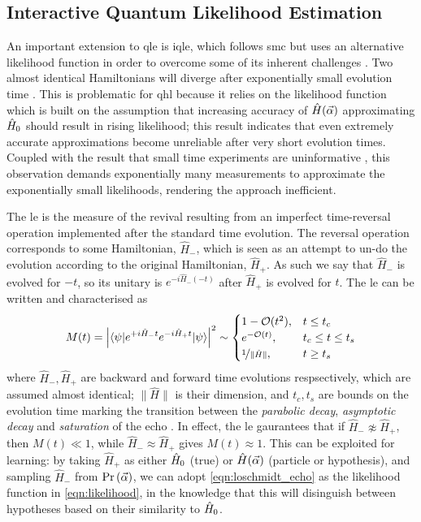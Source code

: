 \subsection{Interactive Quantum Likelihood Estimation}\label{sec:iqle}
An important extension to \gls{qle} is \gls{iqle}, 
    which follows \gls{smc} but uses an alternative \gls{likelihood} function in order to 
    overcome some of its inherent challenges \cite{Wiebe:2014qhl}. 
Two almost identical Hamiltonians will diverge after exponentially small evolution time \cite{jalabert2001environment}.
This is problematic for \gls{qhl} because it relies on the likelihood function which is built on the assumption 
    that increasing accuracy of $\hat{H}(\vec{\alpha})$ approximating $\hat{H}_0$ should result in rising likelihood;
    this result indicates that even extremely accurate approximations become unreliable after very short evolution times. 
Coupled with the result that small time experiments are uninformative \cite{wiebe2015quantum}, 
    this observation demands exponentially many measurements to approximate the exponentially small likelihoods, 
    rendering the approach inefficient. 
\par 
The \gls{le} is the measure of the revival resulting from an imperfect time-reversal operation implemented after the standard time evolution. 
The reversal operation corresponds to some Hamiltonian, $\hat{H}_{-}$, which is seen as an attempt to un-do the evolution
    according to the original Hamiltonian, $\hat{H}_{+}$. 
As such we say that $\hat{H}_{-}$ is evolved for $-t$, so its unitary is $e^{-i \hat{H}_{-}(-t)}$ after $\hat{H}_{+}$ is evolved for $t$. 
The \gls{le} can be written and characterised as 
\begin{align}
    \label{eqn:loschmidt_echo}
    M(t) = \left\lvert  \braket{ \psi | e^{+i\hat{H}_{-} t} e^{-i \hat{H}_{+} t} | \psi}  \right\rvert^2 \sim 
    \begin{cases}
        1 - \mathcal{O}(t^2),  & t \leq t_c \\
        e^{-\mathcal{O}(t)}, & t_c \leq t \leq t_{s} \\
        \nicefrac{1}{\| \hat{H} \|}, & t \geq t_{s}
    \end{cases}
\end{align}
    where $\hat{H}_{-}, \hat{H}_{+}$ are backward and forward time evolutions respsectively, which are assumed almost identical;
    $\|\hat{H}\|$ is their dimension, and $t_c, t_{s}$ are bounds on the evolution time marking the transition between the 
    \emph{parabolic decay}, \emph{asymptotic decay} and \emph{saturation} of the echo \cite{goussev2012loschmidt}. 
In effect, the \gls{le} gaurantees that if $\hat{H}_{-} \not\approx \hat{H}_{+}$, then $M(t) \ll 1$, 
    while $\hat{H}_{-} \approx \hat{H}_{+}$ gives $M(t) \approx 1$. 
This can be exploited for learning: 
    by taking $\hat{H}_{+}$ as either $\hat{H}_0$ (true) or $\hat{H}(\vec{\alpha})$ (particle or hypothesis), 
    and sampling $\hat{H}_{-}$ from $\Pr\left(\vec{\alpha}\right)$, 
    we can adopt \cref{eqn:loschmidt_echo} as the likelihood function in \cref{eqn:likelihood}, 
    in the knowledge that this will disinguish between hypotheses based on their similarity to $\hat{H}_0$.
\par 

